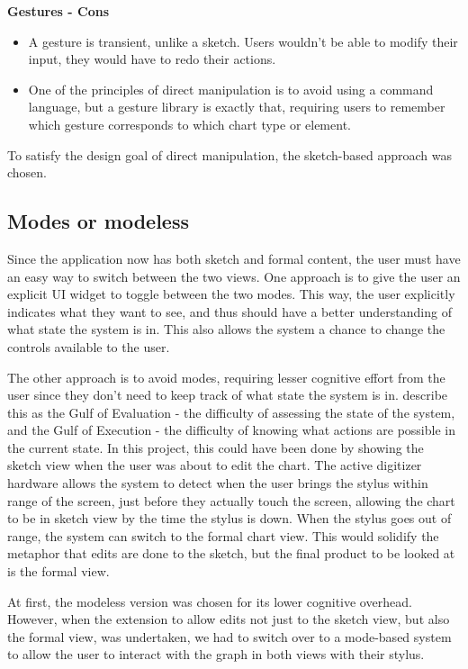 			
			\textbf{Gestures - Cons} 
			\begin{itemize}
			\item A gesture is transient, unlike a sketch. Users wouldn't be able to modify their input, they would have to redo their actions. 
			\item One of the principles of direct manipulation is to avoid using a command language, but a gesture library is exactly that, requiring users to remember which gesture corresponds to which chart type or element. 
			\end{itemize}
				
	To satisfy the design goal of direct manipulation, the sketch-based approach was chosen.

	\subsection{Modes or modeless}
	Since the application now has both sketch and formal content, the user must have an easy way to switch between the two views. One approach is to give the user an explicit UI widget to toggle between the two modes. This way, the user explicitly indicates what they want to see, and thus should have a better understanding of what state the system is in. This also allows the system a chance to change the controls available to the user.
	
	The other approach is to avoid modes, requiring lesser cognitive effort from the user since they don't need to keep track of what state the system is in. \cite{norman_user_1986} describe this as the Gulf of Evaluation - the difficulty of assessing the state of the system, and the Gulf of Execution - the difficulty of knowing what actions are possible in the current state. In this project, this could have been done by showing the sketch view when the user was about to edit the chart. The active digitizer hardware allows the system to detect when the user brings the stylus within range of the screen, just before they actually touch the screen, allowing the chart to be in sketch view by the time the stylus is down. When the stylus goes out of range, the system can switch to the formal chart view. This would solidify the metaphor that edits are done to the sketch, but the final product to be looked at is the formal view. 
	
	At first, the modeless version was chosen for its lower cognitive overhead. However, when the extension to allow edits not just to the sketch view, but also the formal view, was undertaken, we had to switch over to a mode-based system to allow the user to interact with the graph in both views with their stylus.
	
